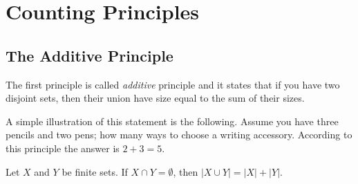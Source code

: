 \chapter{Counting Principles}
\label{chapter:principles}
\section{The Additive Principle}
The first principle is called \emph{additive} principle and it states that if
you have two disjoint sets, then their union have size equal to the sum of their
sizes.

A simple illustration of this statement is the following. Assume you have three
pencils and two pens; how many ways to choose a writing accessory. According to
this principle the answer is $2 + 3 = 5$.
\begin{theorem}
\label{theorem:additive-principle}
  Let $X$ and $Y$ be finite sets. If $X \cap Y = \emptyset$, then $|X \cup Y| =
  |X| + |Y|$.
\end{theorem}
